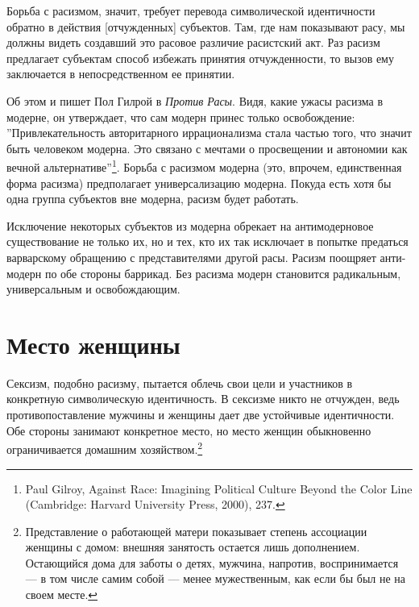 \documentclass[12pt]{book}
\begin{document}
Борьба с расизмом, значит, требует перевода символической идентичности обратно в действия [отчужденных] субъектов. Там, где нам показывают расу, мы должны видеть создавший это расовое различие расистский акт. Раз расизм предлагает субъектам способ избежать принятия отчужденности, то вызов ему заключается в непосредственном ее принятии.

Об этом и пишет Пол Гилрой в \textit{Против Расы}. Видя, какие ужасы расизма в модерне, он утверждает, что сам модерн принес только освобождение: ''Привлекательность авторитарного иррационализма стала частью того, что значит быть человеком модерна. Это связано с мечтами о просвещении и автономии как вечной альтернативе''\footnote{Paul Gilroy, Against Race: Imagining Political Culture Beyond the Color Line (Cambridge: Harvard University Press, 2000), 237.}. Борьба с расизмом модерна (это, впрочем, единственная форма расизма) предполагает универсализацию модерна. Покуда есть хотя бы одна группа субъектов вне модерна, расизм будет работать.

Исключение некоторых субъектов из модерна обрекает на антимодерновое существование не только их, но и тех, кто их так исключает в попытке предаться варварскому обращению с представителями другой расы. Расизм поощряет анти-модерн по обе стороны баррикад. Без расизма модерн становится радикальным, универсальным и освобождающим.

\section{Место женщины}

Сексизм, подобно расизму, пытается облечь свои цели и участников в конкретную символическую идентичность. В сексизме никто не отчужден, ведь противопоставление мужчины и женщины дает две устойчивые идентичности. Обе стороны занимают конкретное место, но место женщин обыкновенно ограничивается домашним хозяйством.\footnote{Представление о работающей матери показывает степень ассоциации женщины с домом: внешняя занятость остается лишь дополнением. Остающийся дома для заботы о детях, мужчина, напротив, воспринимается --- в том числе самим собой --- менее мужественным, как если бы был не на своем месте.}
\end{document}
